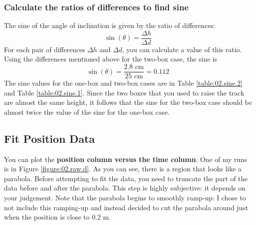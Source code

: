 \subsubsection{Calculate the ratios of differences to find sine}
The sine of the angle of inclination is given by the ratio of differences:
\begin{equation}
    \sin(\theta) = \frac{\Delta h}{\Delta d}
\end{equation}
For each pair of differences $\Delta h$ and $\Delta d$, you can calculate a value of this ratio. Using the differences mentioned above for the two-box case, the sine is
\begin{equation}
    \sin(\theta) = \frac{2.8 \text{ cm}}{25 \text{ cm}} = 0.112
\end{equation}
The sine values for the one-box and two-box cases are in Table \ref{table:02.sine.2} and Table \ref{table:02.sine.1}. Since the two boxes that you used to raise the track are almost the same height, it follows that the sine for the two-box case should be almost twice the value of the sine for the one-box case.
\subsection{Fit Position Data}
You can plot the \textbf{position column versus the time column}. One of my runs is in Figure \ref{figure:02.raw.d}. As you can see, there is a region that looks like a parabola. Before attempting to fit the data, you need to truncate the part of the data before and after the parabola. This step is highly subjective: it depends on your judgement. Note that the parabola begins to smoothly ramp-up: I chose to not include this ramping-up and instead decided to cut the parabola around just when the position is close to 0.2 m.

